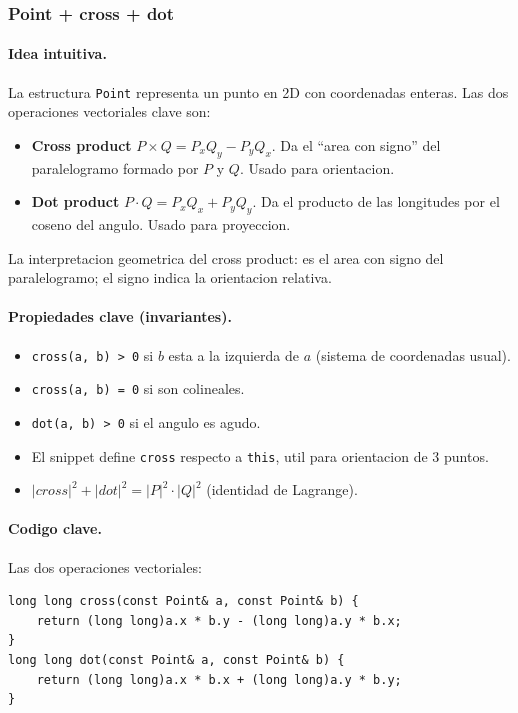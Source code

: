 ﻿\subsubsection{Point + cross + dot}

\paragraph{Idea intuitiva.}
La estructura \texttt{Point} representa un punto en 2D con coordenadas enteras. Las dos operaciones vectoriales clave son:
\begin{itemize}\setlength\itemsep{0pt}
	\item \textbf{Cross product} $P \times Q = P_x Q_y - P_y Q_x$. Da el ``area con signo'' del paralelogramo formado por $P$ y $Q$. Usado para orientacion.
	\item \textbf{Dot product} $P \cdot Q = P_x Q_x + P_y Q_y$. Da el producto de las longitudes por el coseno del angulo. Usado para proyeccion.
\end{itemize}
La interpretacion geometrica del cross product: es el area con signo del paralelogramo; el signo indica la orientacion relativa.

\paragraph{Propiedades clave (invariantes).}
\begin{itemize}\setlength\itemsep{0pt}
	\item \texttt{cross(a, b) > 0} si $b$ esta a la izquierda de $a$ (sistema de coordenadas usual).
	\item \texttt{cross(a, b) = 0} si son colineales.
	\item \texttt{dot(a, b) > 0} si el angulo es agudo.
	\item El snippet define \texttt{cross} respecto a \texttt{this}, util para orientacion de 3 puntos.
	\item $|cross|^2 + |dot|^2 = |P|^2 \cdot |Q|^2$ (identidad de Lagrange).
\end{itemize}

\paragraph{Codigo clave.}
Las dos operaciones vectoriales:
\begin{verbatim}
long long cross(const Point& a, const Point& b) {
    return (long long)a.x * b.y - (long long)a.y * b.x;
}
long long dot(const Point& a, const Point& b) {
    return (long long)a.x * b.x + (long long)a.y * b.y;
}
\end{verbatim}

